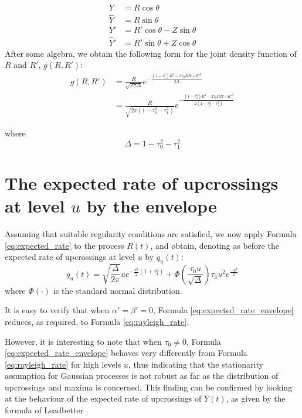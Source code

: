 \documentclass{article}
\newcommand{\cdummy}{\cdot}
\begin{document}
\begin{equation}
  \begin{array}{ll}
    Y & = R \cos \theta\\
    \hat{Y} & = R \sin \theta\\
    Y' & = R' \cos \theta - Z \sin \theta\\
    \hat{Y}' & = R' \sin \theta + Z \cos \theta
  \end{array} \label{eq:transformation}
\end{equation}
After some algebra, we obtain the following form for the joint density
function of $R$ and $R'$, $g (R, R')$:
\begin{equation}
  \label{eq:joint_density} \begin{array}{ll}
    g (R, R') & = \frac{R}{\sqrt{2 \pi \Delta}} e^{- \frac{(1 - \tau_1^2) R^2
    - 2 \tau_0 RR' {+ R'}^2}{2 \Delta}}\\
    & = \frac{R}{\sqrt{2 \pi (1 - \tau_0^2 - \tau_1^2)}} e^{- \frac{(1 -
    \tau_1^2) R^2 - 2 \tau_0 RR' {+ R'}^2}{2 (1 - \tau_0^2 - \tau_1^2)}}
  \end{array}
\end{equation}


where
\begin{equation}
  \Delta = 1 - \tau_0^2 - \tau_1^2
\end{equation}

\section{The expected rate of upcrossings at level $u$ by the envelope}

Assuming that suitable regularity conditions are satisfied, we now apply
Formula \ref{eq:expected_rate} to the process $R (t)$, and obtain, denoting as
before the expected rate of upcrossings at level $u$ by $q_u (t)$:
\begin{equation}
  \label{eq:expected_rate_envelope} q_u (t) = \sqrt{\frac{\Delta}{2 \pi}}
  ue^{- \frac{u^2}{2}  (1 + \tau_1^2)} + \Phi \left( \frac{\tau_0
  u}{\sqrt{\Delta}} \right) \tau_1 u^2 e^{\frac{- u^2}{2}}
\end{equation}
where $\Phi (\cdummy)$ is the standard normal distribution.

It is easy to verify that when $\alpha' = \beta' = 0$, Formula
\ref{eq:expected_rate_envelope} reduces, as required, to Formula
\ref{eq:rayleigh_rate}.

However, it is interesting to note that when $\tau_0 \neq 0$, Formula
\ref{eq:expected_rate_envelope} behaves very differently from Formula
\ref{eq:rayleigh_rate} for high levels $u$, thus indicating that the
stationarity assumption for Gaussian processes is not robust as far as the
distribution of upcrossings and maxima is concerned. This finding can be
confirmed by looking at the behaviour of the expected rate of upcrossings of
$Y (t)$, as given by the formula of Leadbetter {\cite{leadbetter1966}}.
\end{document}
